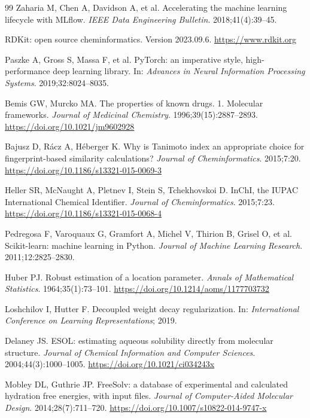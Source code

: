 \begin{thebibliography}{99}
Zaharia M, Chen A, Davidson A, et al. Accelerating the machine learning lifecycle with MLflow. \emph{IEEE Data Engineering Bulletin}. 2018;41(4):39--45.

RDKit: open source cheminformatics. Version 2023.09.6. \url{https://www.rdkit.org}

Paszke A, Gross S, Massa F, et al. PyTorch: an imperative style, high-performance deep learning library. In: \emph{Advances in Neural Information Processing Systems}. 2019;32:8024--8035.

Bemis GW, Murcko MA. The properties of known drugs. 1. Molecular frameworks. \emph{Journal of Medicinal Chemistry}. 1996;39(15):2887--2893. \url{https://doi.org/10.1021/jm9602928}

Bajusz D, R\'acz A, H\'eberger K. Why is Tanimoto index an appropriate choice for fingerprint-based similarity calculations? \emph{Journal of Cheminformatics}. 2015;7:20. \url{https://doi.org/10.1186/s13321-015-0069-3}

Heller SR, McNaught A, Pletnev I, Stein S, Tchekhovskoi D. InChI, the IUPAC International Chemical Identifier. \emph{Journal of Cheminformatics}. 2015;7:23. \url{https://doi.org/10.1186/s13321-015-0068-4}

Pedregosa F, Varoquaux G, Gramfort A, Michel V, Thirion B, Grisel O, et al. Scikit-learn: machine learning in Python. \emph{Journal of Machine Learning Research}. 2011;12:2825--2830.

Huber PJ. Robust estimation of a location parameter. \emph{Annals of Mathematical Statistics}. 1964;35(1):73--101. \url{https://doi.org/10.1214/aoms/1177703732}

Loshchilov I, Hutter F. Decoupled weight decay regularization. In: \emph{International Conference on Learning Representations}; 2019.

Delaney JS. ESOL: estimating aqueous solubility directly from molecular structure. \emph{Journal of Chemical Information and Computer Sciences}. 2004;44(3):1000--1005. \url{https://doi.org/10.1021/ci034243x}

Mobley DL, Guthrie JP. FreeSolv: a database of experimental and calculated hydration free energies, with input files. \emph{Journal of Computer-Aided Molecular Design}. 2014;28(7):711--720. \url{https://doi.org/10.1007/s10822-014-9747-x}


\end{thebibliography}
